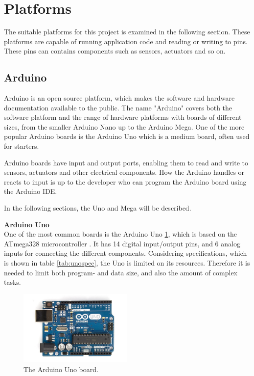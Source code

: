 \section{Platforms}
The suitable platforms for this project is examined in the following section. These platforms are capable of running application code and reading or writing to pins. These pins can contains components such as sensors, actuators and so on.

\subsection{Arduino}\label{sec:arduino}
Arduino is an open source platform, which makes the software and hardware documentation available to the public. The name "Arduino" covers both the software platform and the range of hardware platforms with boards of different sizes, from the smaller Arduino Nano up to the Arduino Mega. One of the more popular Arduino boards is the Arduino Uno which is a medium board, often used for starters\cite{arduinouno}.

Arduino boards have input and output ports, enabling them to read and write to sensors, actuators and other electrical components. How the Arduino handles or reacts to input is up to the developer who can program the Arduino board using the Arduino IDE.

In the following sections, the Uno and Mega will be described.

\textbf{Arduino Uno}\\
One of the most common boards is the Arduino Uno \ref{fig:arduinouno}, which is based on the ATmega328 microcontroller \cite{arduinouno}. It has 14 digital input/output pins, and 6 analog inputs for connecting the different components. Considering specifications, which is shown in table \ref{tab:unospec}, the Uno is limited on its resources. Therefore it is needed to limit both program- and data size, and also the amount of complex tasks.

\begin{figure}[h!]
\centering
\includegraphics[width=0.5\textwidth]{chapters/analysis/figs/ArduinoUno.jpg}
\caption{The Arduino Uno board\cite{arduinointroduction}.}
\label{fig:arduinouno}
\end{figure}

